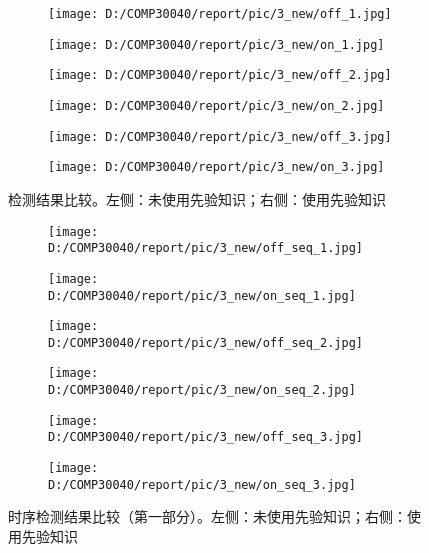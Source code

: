 \documentclass{article}
\begin{document}
\begin{figure}[h!]
  \begin{subfigure}[b]{0.5\linewidth}
  \centering
	\texttt{[image: D:/COMP30040/report/pic/3\_new/off\_1.jpg]} 
  \end{subfigure}
  \begin{subfigure}[b]{0.5\linewidth}
  \centering
	\texttt{[image: D:/COMP30040/report/pic/3\_new/on\_1.jpg]} 
  \end{subfigure}
  \begin{subfigure}[b]{0.5\linewidth}
  \centering
	\texttt{[image: D:/COMP30040/report/pic/3\_new/off\_2.jpg]} 
  \end{subfigure}
  \begin{subfigure}[b]{0.5\linewidth}
  \centering
	\texttt{[image: D:/COMP30040/report/pic/3\_new/on\_2.jpg]} 
  \end{subfigure}
  \begin{subfigure}[b]{0.5\linewidth}
  \centering
	\texttt{[image: D:/COMP30040/report/pic/3\_new/off\_3.jpg]} 
  \end{subfigure}
  \begin{subfigure}[b]{0.5\linewidth}
  \centering
	\texttt{[image: D:/COMP30040/report/pic/3\_new/on\_3.jpg]} 
  \end{subfigure}
  \caption{检测结果比较。左侧：未使用先验知识；右侧：使用先验知识}
\end{figure}

\begin{figure}[h!]
  \begin{subfigure}[b]{0.5\linewidth}
  \centering
	\texttt{[image: D:/COMP30040/report/pic/3\_new/off\_seq\_1.jpg]} 
  \end{subfigure}
  \begin{subfigure}[b]{0.5\linewidth}
  \centering
	\texttt{[image: D:/COMP30040/report/pic/3\_new/on\_seq\_1.jpg]} 
  \end{subfigure}
    \begin{subfigure}[b]{0.5\linewidth}
  \centering
	\texttt{[image: D:/COMP30040/report/pic/3\_new/off\_seq\_2.jpg]} 
  \end{subfigure}
  \begin{subfigure}[b]{0.5\linewidth}
  \centering
	\texttt{[image: D:/COMP30040/report/pic/3\_new/on\_seq\_2.jpg]} 
  \end{subfigure}
    \begin{subfigure}[b]{0.5\linewidth}
  \centering
	\texttt{[image: D:/COMP30040/report/pic/3\_new/off\_seq\_3.jpg]} 
  \end{subfigure}
  \begin{subfigure}[b]{0.5\linewidth}
  \centering
	\texttt{[image: D:/COMP30040/report/pic/3\_new/on\_seq\_3.jpg]} 
  \end{subfigure}
  \caption{时序检测结果比较（第一部分）。左侧：未使用先验知识；右侧：使用先验知识}
\end{figure}
\end{document}
